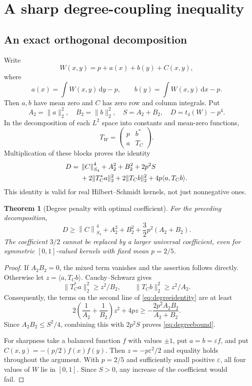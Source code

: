 \documentclass[11pt]{article}
\newtheorem{theorem}{Theorem}[section]
\theoremstyle{definition}
\newcommand{\1}{\mathbf 1}
\newcommand{\Sfour}[1]{\left\|#1\right\|_{S_4}}
\newcommand{\dd}{\,\mathrm d}
\begin{document}
\section{A sharp degree-coupling inequality}\label{sec:degrees}
\subsection{An exact orthogonal decomposition}
Write
\begin{equation}\label{eq:anova}
 W(x,y)=p+a(x)+b(y)+C(x,y),
\end{equation}
where
\[
 a(x)=\int W(x,y)\dd y-p,\qquad
 b(y)=\int W(x,y)\dd x-p.
\]
Then $a,b$ have mean zero and $C$ has zero row and column integrals. Put
\[
 A_2=\|a\|_2^2,\quad B_2=\|b\|_2^2,\quad S=A_2+B_2,
 \quad D=t_4(W)-p^4.
\]
In the decomposition of each $L^2$ space into constants and mean-zero functions,
\[
 T_W=\begin{pmatrix}p&b^*\\a&T_C\end{pmatrix}.
\]
Multiplication of these blocks proves the identity
\begin{align}
D={}&\Sfour{C}^4+A_2^2+B_2^2+2p^2S\notag\\
 &+2\|T_C^*a\|_2^2+2\|T_Cb\|_2^2
       +4p\langle a,T_Cb\rangle.\label{eq:degreeidentity}
\end{align}
This identity is valid for real Hilbert--Schmidt kernels, not just nonnegative ones.

\begin{theorem}[Degree penalty with optimal coefficient]\label{thm:degree}
For the preceding decomposition,
\begin{equation}\label{eq:degreebound}
 D\ge \Sfour{C}^4+A_2^2+B_2^2+\frac32p^2(A_2+B_2).
\end{equation}
The coefficient $3/2$ cannot be replaced by a larger universal coefficient, even for symmetric $[0,1]$-valued kernels with fixed mean $p=2/5$.
\end{theorem}
\begin{proof}
If $A_2B_2=0$, the mixed term vanishes and the assertion follows directly. Otherwise let $z=\langle a,T_Cb\rangle$. Cauchy--Schwarz gives
\[
 \|T_C^*a\|_2^2\ge z^2/B_2,\qquad
 \|T_Cb\|_2^2\ge z^2/A_2.
\]
Consequently, the terms on the second line of \eqref{eq:degreeidentity} are at least
\[
 2\left(\frac1{A_2}+\frac1{B_2}\right)z^2+4pz
 \ge -\frac{2p^2A_2B_2}{A_2+B_2}.
\]
Since $A_2B_2\le S^2/4$, combining this with $2p^2S$ proves \eqref{eq:degreebound}.

For sharpness take a balanced function $f$ with values $\pm1$, put $a=b=\varepsilon f$, and put $C(x,y)=-(p/2)f(x)f(y)$. Then $z=-p\varepsilon^2/2$ and equality holds throughout the argument. With $p=2/5$ and sufficiently small positive $\varepsilon$, all four values of $W$ lie in $[0,1]$. Since $S>0$, any increase of the coefficient would fail.
\end{proof}
\end{document}
